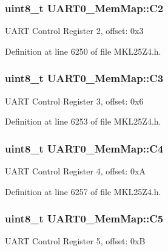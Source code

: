 \subsubsection[{\texorpdfstring{C2}{C2}}]{\setlength{\rightskip}{0pt plus 5cm}uint8\+\_\+t U\+A\+R\+T0\+\_\+\+Mem\+Map\+::\+C2}\hypertarget{struct_u_a_r_t0___mem_map_ab8c8c0d1c432b1580bc02235a62266fb}{}\label{struct_u_a_r_t0___mem_map_ab8c8c0d1c432b1580bc02235a62266fb}
U\+A\+RT Control Register 2, offset\+: 0x3 

Definition at line 6250 of file M\+K\+L25\+Z4.\+h.

\subsubsection[{\texorpdfstring{C3}{C3}}]{\setlength{\rightskip}{0pt plus 5cm}uint8\+\_\+t U\+A\+R\+T0\+\_\+\+Mem\+Map\+::\+C3}\hypertarget{struct_u_a_r_t0___mem_map_ac603121476ec4ef860596f137bc85bdd}{}\label{struct_u_a_r_t0___mem_map_ac603121476ec4ef860596f137bc85bdd}
U\+A\+RT Control Register 3, offset\+: 0x6 

Definition at line 6253 of file M\+K\+L25\+Z4.\+h.

\subsubsection[{\texorpdfstring{C4}{C4}}]{\setlength{\rightskip}{0pt plus 5cm}uint8\+\_\+t U\+A\+R\+T0\+\_\+\+Mem\+Map\+::\+C4}\hypertarget{struct_u_a_r_t0___mem_map_ae1147f361a00a4029f045003d71df762}{}\label{struct_u_a_r_t0___mem_map_ae1147f361a00a4029f045003d71df762}
U\+A\+RT Control Register 4, offset\+: 0xA 

Definition at line 6257 of file M\+K\+L25\+Z4.\+h.

\subsubsection[{\texorpdfstring{C5}{C5}}]{\setlength{\rightskip}{0pt plus 5cm}uint8\+\_\+t U\+A\+R\+T0\+\_\+\+Mem\+Map\+::\+C5}\hypertarget{struct_u_a_r_t0___mem_map_a85d7203b42739b4a364e0f82fc17c391}{}\label{struct_u_a_r_t0___mem_map_a85d7203b42739b4a364e0f82fc17c391}
U\+A\+RT Control Register 5, offset\+: 0xB 

